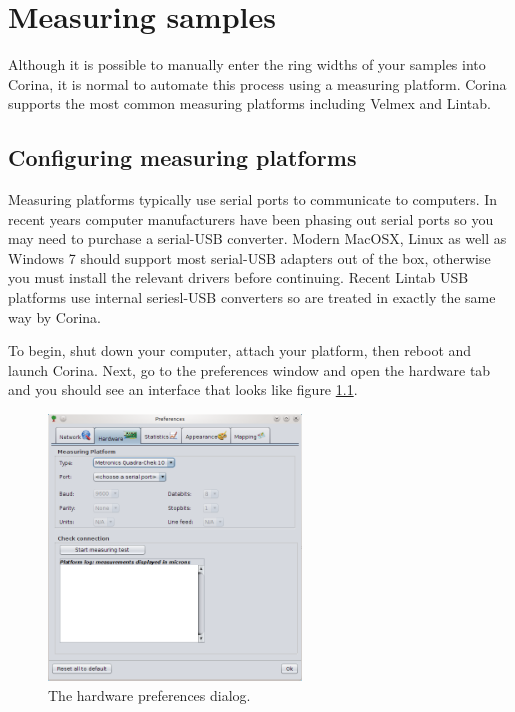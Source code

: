 \chapter{Measuring samples}

Although it is possible to manually enter the ring widths of your samples into Corina, it is normal to automate this process using a measuring platform. Corina supports the most common measuring platforms including Velmex and Lintab.

\section{Configuring measuring platforms}

Measuring platforms typically use serial ports to communicate to computers. In recent years computer manufacturers have been phasing out serial ports so you may need to purchase a serial-USB converter. Modern MacOSX, Linux as well as Windows 7 should support most serial-USB adapters out of the box, otherwise you must install the relevant drivers before continuing.  Recent Lintab USB platforms use internal seriesl-USB converters so are treated in exactly the same way by Corina.

To begin, shut down your computer, attach your platform, then reboot and launch Corina. Next, go to the preferences window and open the hardware tab and you should see an interface that looks like figure \ref{fig:hardwareprefs}.

\begin{figure}[hbtp]
  \centering
    \includegraphics[width=0.6\textwidth]{Images/hardwareprefs.png}
    \caption{The hardware preferences dialog.}
    \label{fig:hardwareprefs}
\end{figure}


